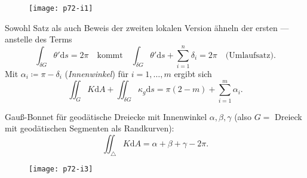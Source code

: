 \begin{figure}[H]
  \texttt{[image: p72-i1]}
\end{figure}

Sowohl Satz als auch Beweis der zweiten lokalen Version ähneln der ersten --- anstelle des Terms
\begin{equation*}
  \int_{\delta G}\theta'\text{d}s = 2\pi \quad \text{kommt} \quad  \int_{\delta G}\theta'\text{d}s + \sum_{i = 1}^n\delta_i = 2\pi \quad \text{(Umlaufsatz).}
\end{equation*}
Mit \( \alpha_i \coloneqq \pi - \delta_i \) (\emph{Innenwinkel}) für \( i = 1,\dots,m \) ergibt sich
\begin{equation*}
  \iint_G K\text{d}A + \iint_{\delta G}\kappa_g\text{d}s = \pi(2-m) + \sum_{i = 1}^m\alpha_i\text{.}
\end{equation*}


\begin{minipage}{.675\textwidth}
  \begin{remark}[Spezialfall]
    Gauß-Bonnet für geodätische Dreiecke mit Innenwinkel \( \alpha,\beta,\gamma \) (also \( G = \) Dreieck mit geodätischen Segmenten als Randkurven):
    \begin{equation*}
      \iint_\triangle K\text{d}A = \alpha + \beta + \gamma -2\pi\text{.}
    \end{equation*}
  \end{remark}  
\end{minipage}
\hfill
\begin{minipage}{.3\textwidth}
  \begin{figure}[H]
    \texttt{[image: p72-i3]}
  \end{figure}
\end{minipage}

